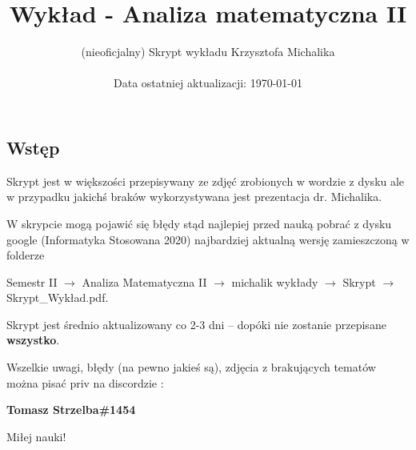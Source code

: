 \documentclass[12pt]{article}
\author{(nieoficjalny) Skrypt wykładu Krzysztofa Michalika \\ \\ Data ostatniej aktualizacji: \today}
\date{}
\title{Wykład - Analiza matematyczna II}
\begin{document}
\maketitle
\tableofcontents

\pagebreak

\subsection{Wstęp}

Skrypt jest w większości przepisywany ze zdjęć zrobionych w wordzie z dysku ale w przypadku jakichś braków wykorzystywana jest
prezentacja dr. Michalika. 

W skrypcie mogą pojawić się błędy stąd najlepiej przed nauką pobrać z dysku google \linebreak (Informatyka Stosowana 2020) najbardziej aktualną wersję
zamieszczoną w folderze 

Semestr II $\rightarrow$ Analiza Matematyczna II $\rightarrow$ michalik wykłady $\rightarrow$ Skrypt $\rightarrow$ Skrypt\_Wykład.pdf.

Skrypt jest średnio aktualizowany co 2-3 dni -- dopóki nie zostanie przepisane \textbf{wszystko}. \medskip

Wszelkie uwagi, błędy (na pewno jakieś są), zdjęcia z brakujących tematów można pisać priv na discordzie : 

\textbf{Tomasz Strzelba\#1454}

Miłej nauki!

\pagebreak


\pagebreak


\pagebreak


\pagebreak


\pagebreak


\pagebreak


\pagebreak
\end{document}
